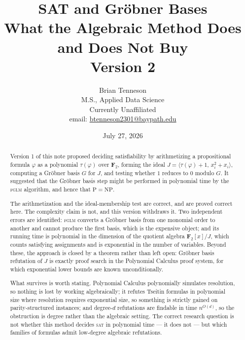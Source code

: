 \documentclass[11pt]{article}
\title{\vspace{-1.2cm}\textbf{\Large SAT and Gr\"obner Bases}\\[0.5em]
{\large What the Algebraic Method Does and Does Not Buy}\\[0.6em]{\large Version 2}}
\author{Brian Tenneson\\ M.S., Applied Data Science\\ Currently Unaffiliated\\
email: \href{mailto:btenneson2301@baypath.edu}{btenneson2301@baypath.edu}}
\date{July 27, 2026}
\theoremstyle{plain}
\theoremstyle{definition}
\theoremstyle{remark}
\newcommand{\FF}{\mathbf{F}_{2}}
\begin{document}
\maketitle
\thispagestyle{empty}

\begin{center}
\end{center}

\vspace{0.8em}
\begin{abstract}
\noindent
Version 1 of this note proposed deciding satisfiability by arithmetizing a
propositional formula $\varphi$ as a polynomial $\tau(\varphi)$ over $\FF$,
forming the ideal $J=\langle\tau(\varphi)+1,\,x_{i}^{2}+x_{i}\rangle$, computing
a Gr\"obner basis $G$ for $J$, and testing whether $1$ reduces to $0$ modulo
$G$. It suggested that the Gr\"obner basis step might be performed in
polynomial time by the \textsc{fglm} algorithm, and hence that
$\mathrm{P}=\mathrm{NP}$.

The arithmetization and the ideal-membership test are correct, and are proved
correct here. The complexity claim is not, and this version withdraws it. Two
independent errors are identified: \textsc{fglm} converts a Gr\"obner basis
from one monomial order to another and cannot produce the first basis, which is
the expensive object; and its running time is polynomial in the dimension of
the quotient algebra $\FF[x]/J$, which counts satisfying assignments and is
exponential in the number of variables. Beyond these, the approach is closed by
a theorem rather than left open: Gr\"obner basis refutation of $J$ is exactly
proof search in the Polynomial Calculus proof system, for which exponential
lower bounds are known unconditionally.

What survives is worth stating. Polynomial Calculus polynomially simulates
resolution, so nothing is lost by working algebraically; it refutes Tseitin
formulas in polynomial size where resolution requires exponential size, so
something is strictly gained on parity-structured instances; and degree-$d$
refutations are findable in time $n^{O(d)}$, so the obstruction is degree
rather than the algebraic setting. The correct research question is not whether
this method decides \textsc{sat} in polynomial time --- it does not --- but
which families of formulas admit low-degree algebraic refutations.
\end{abstract}
\end{document}
